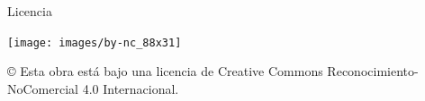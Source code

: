 \documentclass[spanish,a4paper,12pt,oneside]{extreport}
\begin{document}
\bigskip
\begin{LARGE}
Licencia
\end{LARGE}

\begin{center}
\texttt{[image: images/by-nc\_88x31]}\\[5mm]
\end{center}

\begin{large}
© Esta obra está bajo una licencia de Creative Commons Reconocimiento-NoComercial 4.0 Internacional.
\end{large}

\newpage
\thispagestyle{empty}

\newpage 
\thispagestyle{empty}
\end{document}
